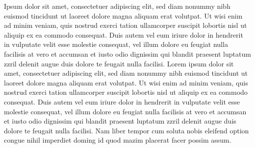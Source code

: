 Ipsum dolor sit amet, consectetuer adipiscing elit, sed diam nonummy nibh euismod tincidunt ut laoreet dolore magna aliquam erat volutpat. Ut wisi enim ad minim veniam, quis nostrud exerci tation ullamcorper suscipit lobortis nisl ut aliquip ex ea commodo consequat. Duis autem vel eum iriure dolor in hendrerit in vulputate velit esse molestie consequat, vel illum dolore eu feugiat nulla facilisis at vero et accumsan et iusto odio dignissim qui blandit praesent luptatum zzril delenit augue duis dolore te feugait nulla facilisi. Lorem ipsum dolor sit amet, consectetuer adipiscing elit, sed diam nonummy nibh euismod tincidunt ut laoreet dolore magna aliquam erat volutpat. Ut wisi enim ad minim veniam, quis nostrud exerci tation ullamcorper suscipit lobortis nisl ut aliquip ex ea commodo consequat. Duis autem vel eum iriure dolor in hendrerit in vulputate velit esse molestie consequat, vel illum dolore eu feugiat nulla facilisis at vero et accumsan et iusto odio dignissim qui blandit praesent luptatum zzril delenit augue duis dolore te feugait nulla facilisi. Nam liber tempor cum soluta nobis eleifend option congue nihil imperdiet doming id quod mazim placerat facer possim assum.
